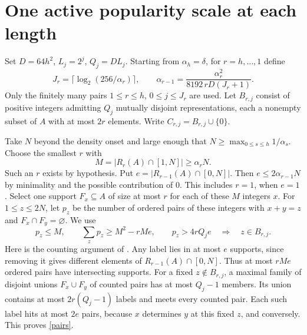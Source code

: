\documentclass[11pt]{article}
\begin{document}
\section{One active popularity scale at each length}
Set $D=64h^2$, $L_j=2^j$, $Q_j=D L_j$. Starting from $\alpha_h=\delta$, for $r=h,\ldots,1$ define
\begin{equation}\label{rec}
 J_r=\lceil\log_2(256/\alpha_r)\rceil,\qquad
 \alpha_{r-1}=\frac{\alpha_r^2}{8192\,rD(J_r+1)}.
\end{equation}
Only the finitely many pairs $1\le r\le h$, $0\le j\le J_r$ are used. Let $B_{r,j}$ consist of positive integers admitting $Q_j$ mutually disjoint representations, each a nonempty subset of $A$ with at most $2r$ elements. Write $C_{r,j}=B_{r,j}\cup\{0\}$.

Take $N$ beyond the density onset and large enough that $N\ge\max_{0\le s\le h}1/\alpha_s$. Choose the smallest $r$ with
\[
 M=|R_r(A)\cap[1,N]|\ge\alpha_rN.
\]
Such an $r$ exists by hypothesis. Put $e=|R_{r-1}(A)\cap[0,N]|$. Then $e\le2\alpha_{r-1}N$ by minimality and the possible contribution of $0$. This includes $r=1$, when $e=1$. Select one support $F_x\subseteq A$ of size at most $r$ for each of these $M$ integers $x$. For $1\le z\le 2N$, let $p_z$ be the number of ordered pairs of these integers with $x+y=z$ and $F_x\cap F_y=\varnothing$. We use
\begin{equation}\label{pairs}
 p_z\le M,\qquad \sum_z p_z\ge M^2-rMe,\qquad p_z>4rQ_je\quad\Longrightarrow\quad z\in B_{r,j}.
\end{equation}
Here is the counting argument of \cite[Lemma~3]{CYZ}. Any label lies in at most $e$ supports, since removing it gives different elements of $R_{r-1}(A)\cap[0,N]$. Thus at most $rMe$ ordered pairs have intersecting supports. For a fixed $z\notin B_{r,j}$, a maximal family of disjoint unions $F_x\cup F_y$ of counted pairs has at most $Q_j-1$ members. Its union contains at most $2r(Q_j-1)$ labels and meets every counted pair. Each such label hits at most $2e$ pairs, because $x$ determines $y$ at this fixed $z$, and conversely. This proves \eqref{pairs}.
\end{document}

